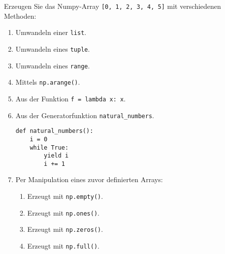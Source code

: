 Erzeugen Sie das Numpy-Array \lstinline![0, 1, 2, 3, 4, 5]! mit verschiedenen
Methoden:

\begin{enumerate}
	\item Umwandeln einer \lstinline!list!.
	\item Umwandeln eines \lstinline!tuple!.
	\item Umwandeln eines \lstinline!range!.
	\item Mittels \lstinline!np.arange()!.
	\item Aus der Funktion \lstinline!f = lambda x: x!.
	\item Aus der Generatorfunktion \lstinline!natural_numbers!.
	\begin{lstlisting}
def natural_numbers():
    i = 0
    while True:
        yield i
        i += 1
	\end{lstlisting}
	\item Per Manipulation eines zuvor definierten Arrays:
	\begin{enumerate}
		\item Erzeugt mit \lstinline!np.empty()!.
		\item Erzeugt mit \lstinline!np.ones()!.
		\item Erzeugt mit \lstinline!np.zeros()!.
		\item Erzeugt mit \lstinline!np.full()!.
	\end{enumerate}
\end{enumerate}
